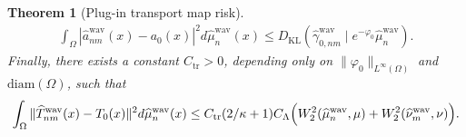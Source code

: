 \documentclass[11pt,reqno]{amsart}
\newtheorem{theorem}{Theorem}
\theoremstyle{definition}
\newcommand{\KL}{\mathrm{KL}}
\renewcommand{\hat}{\widehat}
\begin{document}
\begin{theorem}[Plug-in transport map risk]
\begin{align}
    \int_{\Omega}
    |\hat a_{nm}^{\mathrm{wav}}(x)-a_0(x)|^2 d\hat\mu_n^{\mathrm{wav}}(x)
    \le
    {D_\KL}(\hat\gamma_{0,nm}^{\mathrm{wav}}\mid e^{-\varphi_0}\hat\mu_n^{\mathrm{wav}}).
\end{align}
Finally, there exists a constant $C_{\mathrm{tr}}>0$, depending only on $\|\varphi_0\|_{L^\infty(\Omega)}$ and $\mathrm{diam}(\Omega)$, such that
\begin{align}
\label{eq:uot_plugin_T_to_mu_n}
    \int_{\Omega}
    \|\hat T_{nm}^{\mathrm{wav}}(x)-T_0(x)\|^2 d\hat\mu_n^{\mathrm{wav}}(x)
    \le
    C_{\mathrm{tr}}(2/\kappa+1) C_\Lambda\Bigl(
        W_2^2(\hat\mu_n^{\mathrm{wav}},\mu)
        +
        W_2^2(\hat\nu_m^{\mathrm{wav}},\nu)
    \Bigr).
\end{align}
\end{theorem}
\end{document}
